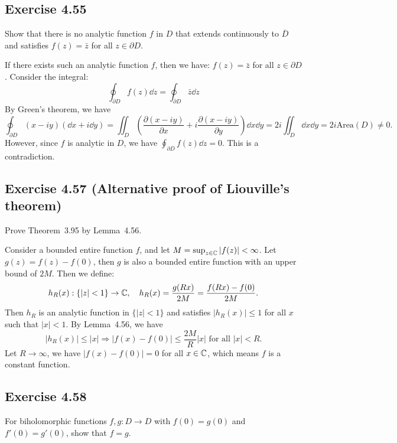\documentclass{article}
\begin{document}
\subsection{Exercise 4.55}

Show that there is no analytic function $f$ in $D$ that extends
continuously to $\overline{D}$ and satisfies $f(z) = \bar{z}$ for all
$z \in \partial D$.

\begin{solution}
  If there exists such an analytic function $f$, then we have: $f(z)
  = \bar{z}$ for all $z \in \partial D$. Consider the integral:
  \[
    \oint_{\partial D} f(z) \dd z = \oint_{\partial D} \bar{z} \dd z
  \]
  By Green's theorem, we have
  \[
    \oint_{\partial D} (x-iy)(\dd x + i \dd y) = \iint_D
    \left(\frac{\partial (x-iy)}{\partial x} + i \frac{\partial
    (x-iy)}{\partial y}\right) \dd x \dd y = 2i \iint_D \dd x \dd y =
    2i\text{Area}(D) \ne 0.
  \]
  However, since $f$ is analytic in $D$, we have $\oint_{\partial D}
  f(z) \dd z = 0$. This is a contradiction.
\end{solution}

\subsection{Exercise 4.57 (Alternative proof of Liouville's theorem)}

Prove Theorem~3.95 by Lemma~4.56.

\begin{solution}
  Consider a bounded entire function $f$, and let $M = \sup_{z \in
  \mathbb{C}} |f(z)| < \infty$. Let $g(z) = f(z) - f(0)$, then $g$ is also a
  bounded entire function with an upper bound of $2M$. Then we define:
  \[
    h_R(x): \{|z| < 1\} \to \mathbb{C}, \quad h_R(x) = \frac{g(Rx)}{2M} =
    \frac{f(Rx) - f(0)}{2M}.
  \]
  Then $h_R$ is an analytic function in $\{|z| < 1\}$ and satisfies
  $|h_R(x)| \le 1$ for all $x$ such that $|x| < 1$. By Lemma~4.56, we have
  \[
    |h_R(x)| \leq |x| \Rightarrow |f(x) - f(0)| \leq \frac{2M}{R} |x|
    \text{ for all } |x| < R.
  \]
  Let $R \to \infty$, we have $|f(x) - f(0)| = 0$ for all $x \in \mathbb{C}$,
  which means $f$ is a constant function.
\end{solution}

\subsection{Exercise 4.58}

For biholomorphic functions $f, g : D \to D$ with $f(0) = g(0)$ and
$f'(0) = g'(0)$, show that $f = g$.
\end{document}
